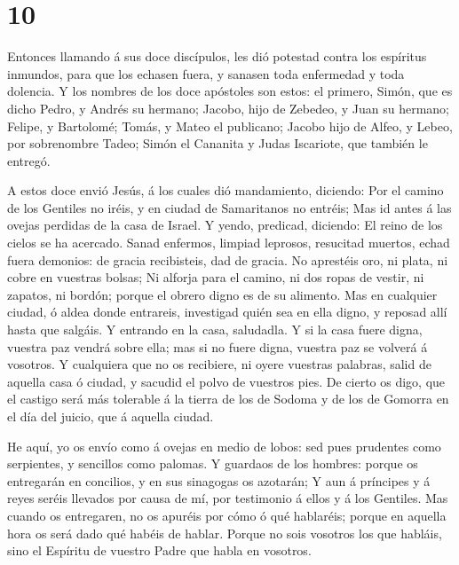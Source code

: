 \hypertarget{section-9}{%
\section{10}\label{section-9}}

 Entonces llamando á sus doce discípulos, les dió potestad
contra los espíritus inmundos, para que los echasen fuera, y sanasen
toda enfermedad y toda dolencia.  Y los nombres de los doce
apóstoles son estos: el primero, Simón, que es dicho Pedro, y Andrés su
hermano; Jacobo, hijo de Zebedeo, y Juan su hermano; 
Felipe, y Bartolomé; Tomás, y Mateo el publicano; Jacobo hijo de Alfeo,
y Lebeo, por sobrenombre Tadeo;  Simón el Cananita y Judas
Iscariote, que también le entregó.

 A estos doce envió Jesús, á los cuales dió mandamiento,
diciendo: Por el camino de los Gentiles no iréis, y en ciudad de
Samaritanos no entréis;  Mas id antes á las ovejas perdidas
de la casa de Israel.  Y yendo, predicad, diciendo: El reino
de los cielos se ha acercado.  Sanad enfermos, limpiad
leprosos, resucitad muertos, echad fuera demonios: de gracia
recibisteis, dad de gracia.  No aprestéis oro, ni plata, ni
cobre en vuestras bolsas;  Ni alforja para el camino, ni
dos ropas de vestir, ni zapatos, ni bordón; porque el obrero digno es de
su alimento.  Mas en cualquier ciudad, ó aldea donde
entrareis, investigad quién sea en ella digno, y reposad allí hasta que
salgáis.  Y entrando en la casa, saludadla.  Y
si la casa fuere digna, vuestra paz vendrá sobre ella; mas si no fuere
digna, vuestra paz se volverá á vosotros.  Y cualquiera que
no os recibiere, ni oyere vuestras palabras, salid de aquella casa ó
ciudad, y sacudid el polvo de vuestros pies.  De cierto os
digo, que el castigo será más tolerable á la tierra de los de Sodoma y
de los de Gomorra en el día del juicio, que á aquella ciudad.

 He aquí, yo os envío como á ovejas en medio de lobos: sed
pues prudentes como serpientes, y sencillos como palomas. 
Y guardaos de los hombres: porque os entregarán en concilios, y en sus
sinagogas os azotarán;  Y aun á príncipes y á reyes seréis
llevados por causa de mí, por testimonio á ellos y á los Gentiles.
 Mas cuando os entregaren, no os apuréis por cómo ó qué
hablaréis; porque en aquella hora os será dado qué habéis de hablar.
 Porque no sois vosotros los que habláis, sino el Espíritu
de vuestro Padre que habla en vosotros.

